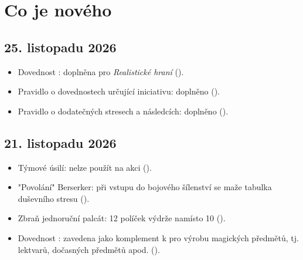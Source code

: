 \documentclass[../main.tex]{subfiles}
\begin{document}
\section{Co je nového}
\label{sec:zmeny}

\subsection*{25. listopadu 2026}
\begin{itemize}
  \item Dovednost : doplněna pro \emph{Realistické hraní}
    ().
  \item Pravidlo o dovednostech určující iniciativu: doplněno ().
  \item Pravidlo o dodatečných stresech a následcích: doplněno ().
\end{itemize}

\subsection*{21. listopadu 2026}
\begin{itemize}
  \item Týmové úsilí: nelze použít na akci  ().
  \item "Povolání" Berserker: při vstupu do bojového šílenství se maže tabulka duševního
    stresu ().
  \item Zbraň jednoruční palcát: 12 políček výdrže namísto 10 ().
  \item Dovednost : zavedena jako komplement k  pro
    výrobu magických předmětů, tj. lektvarů, dočasných předmětů apod. ().
\end{itemize}
\end{document}
